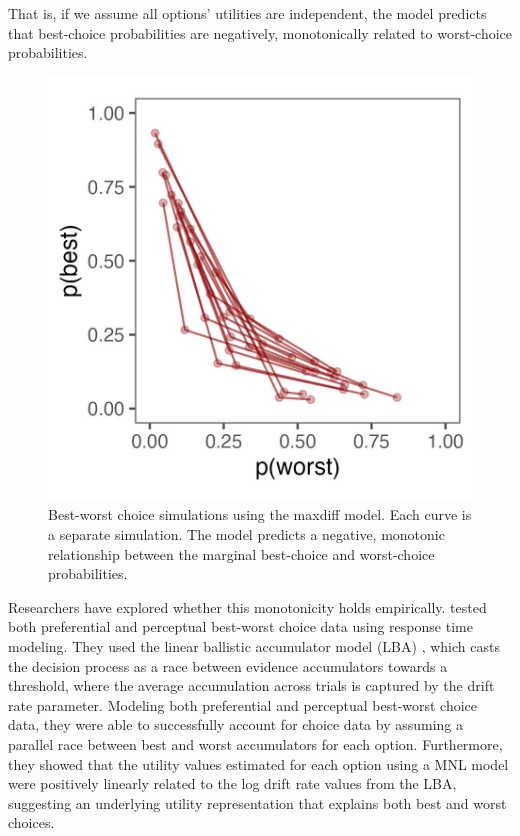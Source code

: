 That is, if we assume all options' utilities are independent, the model predicts that best-choice probabilities are negatively, monotonically related to worst-choice probabilities. 

\begin{figure}
   \includegraphics[width=150mm]{figures/maxdiff_sim_monotonic.jpeg}
   \caption{Best-worst choice simulations using the maxdiff model. Each curve is a separate simulation. The model predicts a negative, monotonic relationship between the marginal best-choice and worst-choice probabilities.}
   \label{fig:maxdiff_sim}
\end{figure}

Researchers have explored whether this monotonicity holds empirically. \textcite{hawkinsIntegratingCognitiveProcess2014a} tested both preferential and perceptual best-worst choice data using response time modeling. They used the linear ballistic accumulator model (LBA) \parencite{brownSimplestCompleteModel2008b}, which casts the decision process as a race between evidence accumulators towards a threshold, where the average accumulation across trials is captured by the drift rate parameter. Modeling both preferential and perceptual best-worst choice data, they were able to successfully account for choice data by assuming a parallel race between best and worst accumulators for each option. Furthermore, they showed that the utility values estimated for each option using a MNL model were positively linearly related to the log drift rate values from the LBA, suggesting an underlying utility representation that explains both best and worst choices. 

